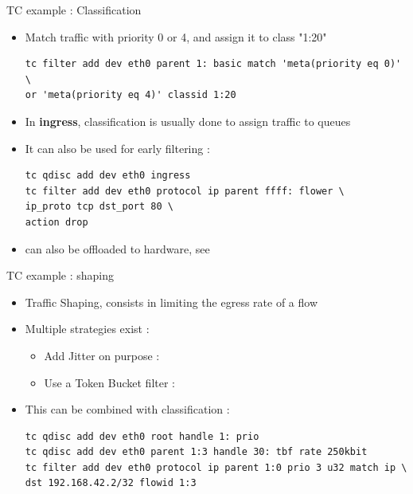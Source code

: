 \begin{frame}[fragile]{TC example : Classification}
	\begin{itemize}
		\item Match traffic with priority 0 or 4, and assign it to class "1:20"
	\begin{verbatim}
tc filter add dev eth0 parent 1: basic match 'meta(priority eq 0)' \
or 'meta(priority eq 4)' classid 1:20
	\end{verbatim}
		\item In \textbf{ingress}, classification is usually done to assign traffic to queues
		\item It can also be used for early filtering : \begin{verbatim}
tc qdisc add dev eth0 ingress
tc filter add dev eth0 protocol ip parent ffff: flower \
ip_proto tcp dst_port 80 \
action drop
\end{verbatim}
	\item {} can also be offloaded to hardware, see 
	\end{itemize}
\end{frame}

\begin{frame}[fragile]{TC example : shaping}
	\begin{itemize}
		\item Traffic Shaping, consists in limiting the egress rate of a flow
		\item Multiple strategies exist :
			\begin{itemize}
				\item Add Jitter on purpose : 
				\item Use a Token Bucket filter : 
			\end{itemize}
		\item This can be combined with classification :
			\begin{verbatim}
tc qdisc add dev eth0 root handle 1: prio
tc qdisc add dev eth0 parent 1:3 handle 30: tbf rate 250kbit
tc filter add dev eth0 protocol ip parent 1:0 prio 3 u32 match ip \
dst 192.168.42.2/32 flowid 1:3
			\end{verbatim}
	\end{itemize}
\end{frame}

